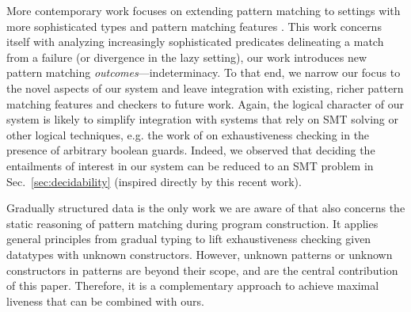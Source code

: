 More contemporary work focuses on extending pattern matching to settings with more sophisticated types and pattern matching features \cite{DBLP:conf/icfp/VazouSJVJ14,DBLP:journals/pacmpl/CockxA18,DBLP:conf/itp/Sozeau10,DBLP:conf/icfp/KarachaliasSVJ15,DBLP:journals/pacmpl/GrafJS20,DBLP:journals/jfp/ConventLMM20}.
This work concerns itself with analyzing increasingly sophisticated predicates delineating a match from a failure (or divergence in the lazy setting), our work introduces new pattern matching \emph{outcomes}---indeterminacy.
To that end, we narrow our focus to the novel aspects of our system and leave integration with existing, richer pattern matching features and checkers to future work. Again, the logical character of our system is likely to simplify integration with systems that rely on SMT solving or other logical techniques, e.g. the work of \citet{DBLP:journals/pacmpl/GrafJS20} on exhaustiveness checking in the presence of arbitrary boolean guards. Indeed, we observed that deciding the entailments of interest in our system can be reduced to an SMT problem in Sec.~\ref{sec:decidability} (inspired directly by this recent work).

Gradually structured data \cite{DBLP:journals/pacmpl/MalewskiGT21} is
the only work we are aware of that also concerns the static reasoning
of pattern matching during program construction. It applies general
principles from gradual typing to lift exhaustiveness checking given
datatypes with unknown constructors. However, unknown patterns or
unknown constructors in patterns are beyond their scope, and are the
central contribution of this paper. Therefore, it is a complementary 
approach to achieve maximal liveness that can be combined with ours.




